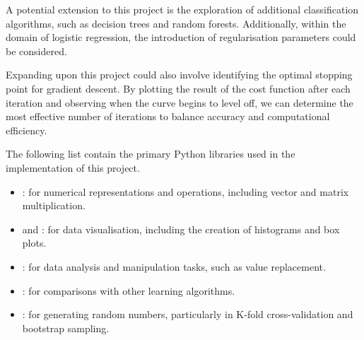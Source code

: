 \documentclass[12pt]{article}
\begin{document}
A potential extension to %
this project is the exploration of additional classification algorithms, such as decision trees and random forests. 
Additionally, within the domain of logistic regression, the introduction of regularisation parameters could be considered.

Expanding upon %
this project could also involve identifying the optimal stopping point for gradient descent. 
By plotting the result of the cost function after each iteration and observing when the curve begins to level off, we can determine the most effective number of iterations to balance accuracy and computational efficiency.

\newpage




\printbibliography


The following list contain the primary Python libraries used in the implementation of this project.

\vspace{-6pt}

\begin{itemize}
\setlength\itemsep{-0.3em}
  \item {} : for numerical representations and operations, including vector and matrix multiplication.
  \item {} and  : for data visualisation, including the creation of histograms and box plots.
  \item {} : for data analysis and manipulation tasks, such as value replacement.
  \item {} : for comparisons with other learning algorithms.
  \item {} : for generating random numbers, particularly in K-fold cross-validation and bootstrap sampling.
\end{itemize}
\end{document}
